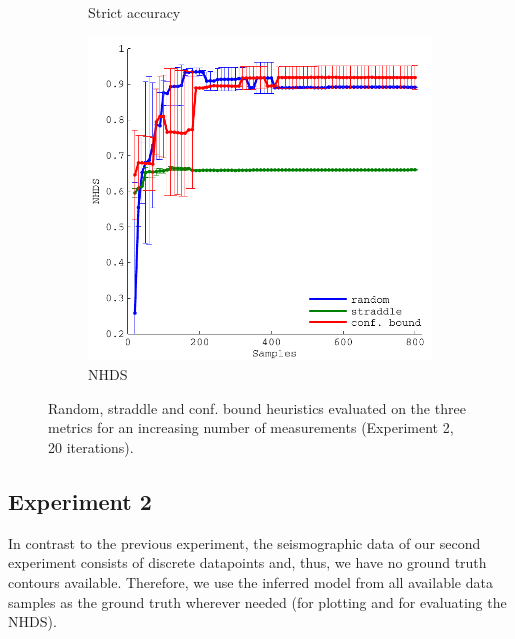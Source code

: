 \documentclass[11pt]{article} %
\begin{document}
\begin{figure}[h!]
\begin{subfigure}[b]{0.329\textwidth}
    \caption{Strict accuracy}
  \end{subfigure}
  \hfill
  \begin{subfigure}[b]{0.329\textwidth}
    \centering
    \includegraphics[width=\textwidth]{figures/quake_hd}
    \caption{NHDS}
  \end{subfigure}
  \caption{Random, straddle and conf. bound heuristics evaluated on the three
           metrics for an increasing number of measurements
           (Experiment 2, 20 iterations).}
  \label{fig:quake_eval}
\end{figure}

\subsection{Experiment 2}
In contrast to the previous experiment, the seismographic data of our second
experiment consists of discrete datapoints and, thus, we have no ground
truth contours available. Therefore, we use the inferred model from all
available data samples as the ground truth wherever needed (for plotting and
for evaluating the NHDS).
\end{document}
